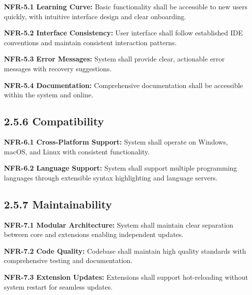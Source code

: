 \textbf{NFR-5.1 Learning Curve:}
Basic functionality shall be accessible to new users quickly, with intuitive interface design and clear onboarding.

\textbf{NFR-5.2 Interface Consistency:}
User interface shall follow established IDE conventions and maintain consistent interaction patterns.

\textbf{NFR-5.3 Error Messages:}
System shall provide clear, actionable error messages with recovery suggestions.

\textbf{NFR-5.4 Documentation:}
Comprehensive documentation shall be accessible within the system and online.

\subsection*{2.5.6 Compatibility}

\textbf{NFR-6.1 Cross-Platform Support:}
System shall operate on Windows, macOS, and Linux with consistent functionality.

\textbf{NFR-6.2 Language Support:}
System shall support multiple programming languages through extensible syntax highlighting and language servers.


\subsection*{2.5.7 Maintainability}

\textbf{NFR-7.1 Modular Architecture:}
System shall maintain clear separation between core and extensions enabling independent updates.

\textbf{NFR-7.2 Code Quality:}
Codebase shall maintain high quality standards with comprehensive testing and documentation.

\textbf{NFR-7.3 Extension Updates:}
Extensions shall support hot-reloading without system restart for seamless updates.
